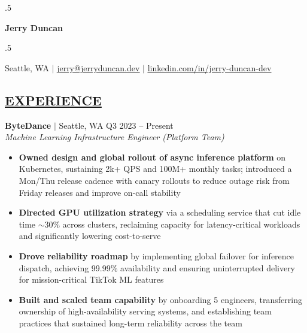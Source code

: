 \documentclass[overlapped,line,11pt]{res}
\begin{document}
\moveleft.5\hoffset\centerline{\huge\bf Jerry Duncan}
\vspace{.2em}
\moveleft.5\hoffset\centerline{Seattle, WA $|$ \href{mailto:jerry@jerryduncan.dev}{\uline{jerry@jerryduncan.dev}} $|$ \href{https://www.linkedin.com/in/jerry-duncan-dev}{\uline{linkedin.com/in/jerry-duncan-dev}}}
\vspace{0.5em}

\begin{resume}

\section{\underline{EXPERIENCE}}
\vspace{4pt}

\textbf{ByteDance} $|$ Seattle, WA \hfill Q3 2023 -- Present\\
{\sl Machine Learning Infrastructure Engineer (Platform Team)}
\vspace{4pt}
\begin{itemize} \itemsep 2pt
  \item \textbf{Owned design and global rollout of async inference platform} on Kubernetes, sustaining 2k+ QPS and 100M+ monthly tasks; introduced a Mon/Thu release cadence with canary rollouts to reduce outage risk from Friday releases and improve on-call stability
  \item \textbf{Directed GPU utilization strategy} via a scheduling service that cut idle time $\sim$30\% across clusters, reclaiming capacity for latency-critical workloads and significantly lowering cost-to-serve

  \item \textbf{Drove reliability roadmap} by implementing global failover for inference dispatch, achieving 99.99\% availability and ensuring uninterrupted delivery for mission-critical TikTok ML features
  \item \textbf{Built and scaled team capability} by onboarding 5 engineers, transferring ownership of high-availability serving systems, and establishing team practices that sustained long-term reliability across the team
\end{itemize}



\end{resume}
\end{document}
